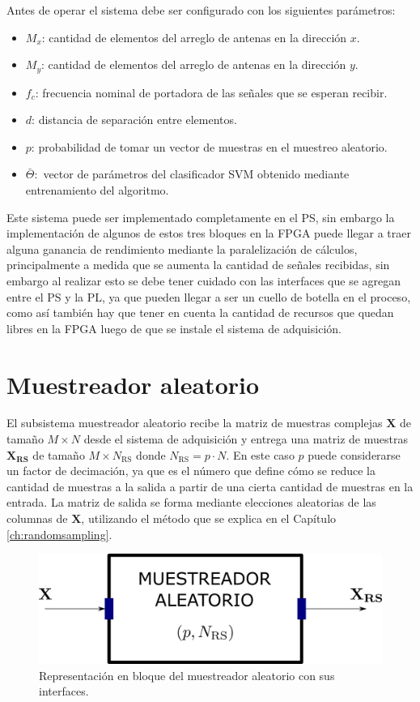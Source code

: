 Antes de operar el sistema debe ser configurado con los siguientes parámetros:
\begin{itemize}
    \item $M_x$: cantidad de elementos del arreglo de antenas en la dirección $x$.
    \item $M_y$: cantidad de elementos del arreglo de antenas en la dirección $y$.
    \item $f_c$: frecuencia nominal de portadora de las señales que se esperan recibir.
    \item $d$: distancia de separación entre elementos.
    \item $p$: probabilidad de tomar un vector de muestras en el muestreo aleatorio.
    \item $\bar{\Theta}:$ vector de parámetros del clasificador SVM obtenido mediante entrenamiento del algoritmo.
\end{itemize}

Este sistema puede ser implementado completamente en el PS, sin embargo la implementación de algunos de estos tres bloques en la FPGA puede llegar a traer alguna ganancia de rendimiento mediante la paralelización de cálculos, principalmente a medida que se aumenta la cantidad de señales recibidas, sin embargo al realizar esto se debe tener cuidado con las interfaces que se agregan entre el PS y la PL, ya que pueden llegar a ser un cuello de botella en el proceso, como así también hay que tener en cuenta la cantidad de recursos que quedan libres en la FPGA luego de que se instale el sistema de adquisición.

\section{Muestreador aleatorio}\label{subc:sistema_randomsampler}

El subsistema muestreador aleatorio recibe la matriz de muestras complejas $\mathbf{X}$ de tamaño $M \times N$ desde el sistema de adquisición y entrega una matriz de muestras $\mathbf{X_{RS}}$ de tamaño $M \times N_{\textrm{RS}}$ donde $N_{\textrm{RS}} = p\cdot N$. En este caso $p$ puede considerarse un factor de decimación, ya que es el número que define cómo se reduce la cantidad de muestras a la salida a partir de una cierta cantidad de muestras en la entrada. La matriz de salida se forma mediante elecciones aleatorias de las columnas de $\mathbf{X}$, utilizando el método que se explica en el Capítulo \ref{ch:randomsampling}.

\begin{figure}[ht!]
    \centering
    \includegraphics[width=0.6\linewidth]{images/06-Sistema/sistema_randomsampler.png}
    \caption{Representación en bloque del muestreador aleatorio con sus interfaces.}
    \label{fig:sistema_randomsampler}
\end{figure}


